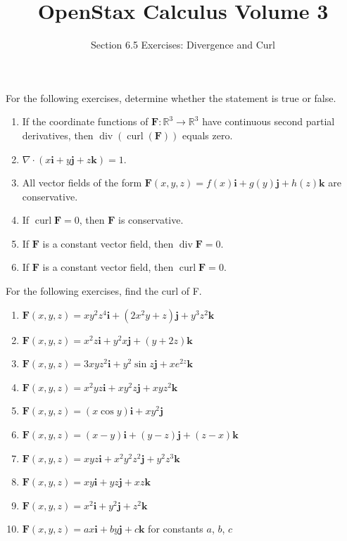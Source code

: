 \documentclass{exercises}
\title{OpenStax Calculus Volume 3}
\subtitle{Section 6.5 Exercises: Divergence and Curl}
\author{}
\date{}
\begin{document}
\maketitle


For the following exercises, determine whether the statement is true or false.

\begin{enumerate}[start=1]
\item If the coordinate functions of $\mathbf{F}:\mathbb{R}^{3}\to \mathbb{R}^{3}$ have continuous second partial derivatives, then $\operatorname{div}(\operatorname{curl}(\mathbf{F}))$ equals zero.
\item $\nabla \cdot(x\mathbf{i}+y\mathbf{j}+z\mathbf{k})=1$.
\item All vector fields of the form $\mathbf{F}(x,y,z)=f(x)\mathbf{i}+g(y)\mathbf{j}+h(z)\mathbf{k}$ are conservative.
\item If $\operatorname{curl}\mathbf{F}=0$, then $\mathbf{F}$ is conservative.
\item If $\mathbf{F}$ is a constant vector field, then $\operatorname{div}\mathbf{F}=0$.
\item If $\mathbf{F}$ is a constant vector field, then $\operatorname{curl}\mathbf{F}=0$.
\end{enumerate}

For the following exercises, find the curl of F.

\begin{enumerate}[resume]
\item $\mathbf{F}(x,y,z)=xy^{2}z^{4}\mathbf{i}+(2x^{2}y+z)\mathbf{j}+y^{3}z^{2}\mathbf{k}$
\item $\mathbf{F}(x,y,z)=x^{2}z\mathbf{i}+y^{2}x\mathbf{j}+(y+2z)\mathbf{k}$
\item $\mathbf{F}(x,y,z)=3xyz^{2}\mathbf{i}+y^{2}\sin z\mathbf{j}+xe^{2z}\mathbf{k}$
\item $\mathbf{F}(x,y,z)=x^{2}yz\mathbf{i}+xy^{2}z\mathbf{j}+xyz^{2}\mathbf{k}$
\item $\mathbf{F}(x,y,z)=(x\cos y)\mathbf{i}+xy^{2}\mathbf{j}$
\item $\mathbf{F}(x,y,z)=(x-y)\mathbf{i}+(y-z)\mathbf{j}+(z-x)\mathbf{k}$
\item $\mathbf{F}(x,y,z)=xyz\mathbf{i}+x^{2}y^{2}z^{2}\mathbf{j}+y^{2}z^{3}\mathbf{k}$
\item $\mathbf{F}(x,y,z)=xy\mathbf{i}+yz\mathbf{j}+xz\mathbf{k}$
\item $\mathbf{F}(x,y,z)=x^{2}\mathbf{i}+y^{2}\mathbf{j}+z^{2}\mathbf{k}$
\item $\mathbf{F}(x,y,z)=ax\mathbf{i}+by\mathbf{j}+c\mathbf{k}$ for constants $a$, $b$, $c$
\end{enumerate}
\end{document}
